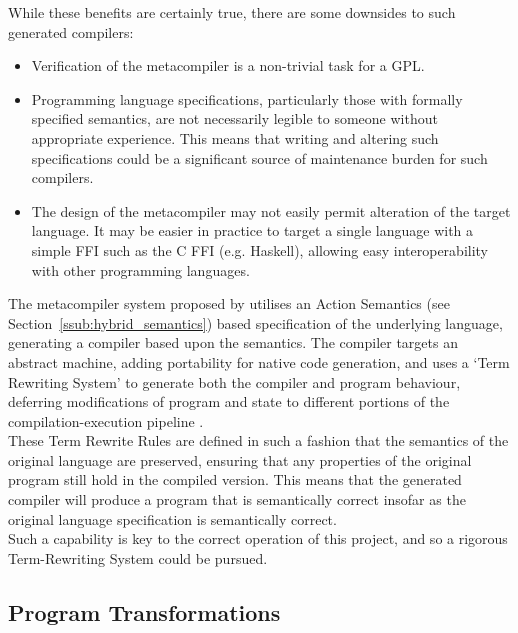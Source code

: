 While these benefits are certainly true, there are some downsides to such generated compilers:
\begin{itemize}
    \item Verification of the metacompiler is a non-trivial task for a GPL.
    \item Programming language specifications, particularly those with formally specified semantics, are not necessarily legible to someone without appropriate experience. 
    This means that writing and altering such specifications could be a significant source of maintenance burden for such compilers.
    \item The design of the metacompiler may not easily permit alteration of the target language.
    It may be easier in practice to target a single language with a simple FFI such as the C FFI (e.g. Haskell), allowing easy interoperability with other programming languages. 
\end{itemize}

The metacompiler system proposed by \citet{diehl1996semantics} utilises an Action Semantics (see Section~\ref{ssub:hybrid_semantics}) based specification of the underlying language, generating a compiler based upon the semantics. 
The compiler targets an abstract machine, adding portability for native code generation, and uses a `Term Rewriting System' to generate both the compiler and program behaviour, deferring modifications of program and state to different portions of the compilation-execution pipeline \citep[pg. 59]{diehl1996semantics}.\\

These Term Rewrite Rules are defined in such a fashion that the semantics of the original language are preserved, ensuring that any properties of the original program still hold in the compiled version.
This means that the generated compiler will produce a program that is semantically correct insofar as the original language specification is semantically correct. \\

Such a capability is key to the correct operation of this project, and so a rigorous Term-Rewriting System could be pursued. 


\subsection{Program Transformations} %
\label{sub:program_transformations}

